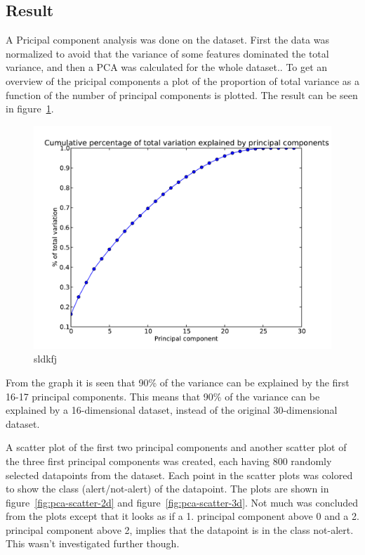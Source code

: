 \subsection{Result}
A Pricipal component analysis was done on the dataset. First the data was normalized to avoid that the variance of some features dominated the total variance, and then a PCA was calculated for the whole dataset.. To get an overview of the pricipal components a plot of the proportion of total variance  as a function of the number of principal components is plotted. The result can be seen in figure~\ref{fig:variance-explained}.\par
\begin{figure}
    \centering
    \includegraphics[width=.5\textwidth]{../sessions/15-new-principal-components-analysis/plots/pca-variation-explained.pdf}
    \caption{sldkfj}\label{fig:variance-explained}
\end{figure}
From the graph it is seen that 90\% of the variance can be explained by the first 16-17 principal components. This means that 90\% of the variance can be explained by a 16-dimensional dataset, instead of the original 30-dimensional dataset.\par
A scatter plot of the first two principal components and another scatter plot of the three first principal components was created, each having 800 randomly selected datapoints from the dataset. Each point in the scatter plots was colored to show the class (alert/not-alert) of the datapoint. The plots are shown in figure~\ref{fig:pca-scatter-2d} and figure~\ref{fig:pca-scatter-3d}. Not much was concluded from the plots except that it looks as if a 1. principal component above 0 and a 2. principal component above 2, implies that the datapoint is in the class not-alert. This wasn't investigated further though.
